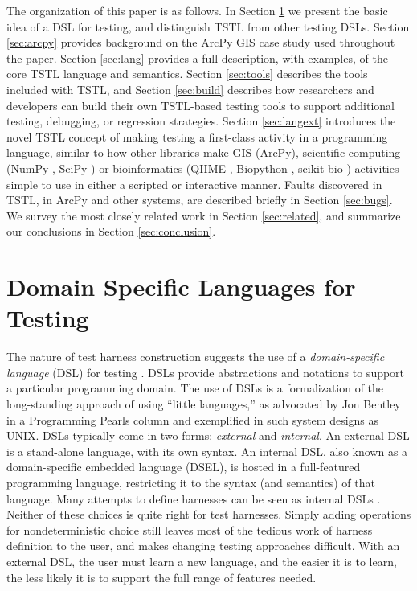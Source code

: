 The organization of this paper is as follows.  In Section
\ref{sec:dsltest} we present the basic idea of a DSL for testing, and
distinguish TSTL from other testing DSLs.  Section \ref{sec:arcpy} 
provides background on the ArcPy GIS case study used throughout the
paper.  Section \ref{sec:lang} provides a full description, with
examples, of the core TSTL language and semantics.  Section
\ref{sec:tools} describes the tools included with TSTL, and
Section \ref{sec:build} describes how researchers and developers can
build their own TSTL-based testing tools to support additional
testing, debugging, or regression strategies.  Section
\ref{sec:langext} introduces the novel TSTL concept of making testing
a first-class activity in a programming language, similar to how other
libraries make GIS (ArcPy), scientific computing (NumPy \cite{NumPy},
SciPy \cite{SciPy}) or bioinformatics
(QIIME \cite{QIIME}, Biopython \cite{biopython}, scikit-bio \cite{scikitbio}) activities simple to use in either a scripted or
interactive manner.  Faults discovered
in TSTL, in ArcPy and other systems, are described briefly in Section
\ref{sec:bugs}.  We survey the most closely related work in Section
\ref{sec:related}, and summarize our conclusions in Section \ref{sec:conclusion}.

\section{Domain Specific Languages for Testing}
\label{sec:dsltest}

The nature of test harness construction suggests the use of a
\emph{domain-specific language} (DSL) for testing \cite{ISOLA12}.  DSLs
\cite{Fow10} provide abstractions and notations to support a
particular programming domain. The use of DSLs is a formalization of
the long-standing approach of using ``little languages,'' as advocated by Jon Bentley in a
Programming Pearls column \cite{LitLang} and exemplified in such system
designs as UNIX.  DSLs typically come in two forms: \emph{external}
and \emph{internal}.  An external DSL is a stand-alone language, with
its own syntax.  An internal DSL, also known as a domain-specific
embedded language (DSEL), is hosted in a full-featured programming
language, restricting it to the syntax (and semantics) of that
language.  Many attempts to define harnesses can be seen as internal
DSLs \cite{UDITA,ISSRE12,JPF2,CBMCp,KLEE}.  Neither of these choices
is quite right for test harnesses.  Simply adding operations for
nondeterministic choice still leaves most of
the tedious work of harness definition to the user, and makes changing
testing approaches difficult.  With an external DSL, the user
must learn a new language, and the easier it is to learn, the less
likely it is to support the full range of features needed.

